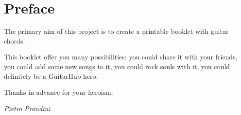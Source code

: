 \section*{Preface}
The primary aim of this project is to create a printable booklet with guitar chords.\par
This booklet offer you many possibilities: you could share it with your friends, you could add some new songs to it,
you could rock souls with it, you could definitely be a GuitarHub hero.\par
Thanks in advance for your heroism.\par
\begin{flushright}
	{\textit{\rmfamily Pietro Prandini}}\par
\end{flushright}
\newpage
